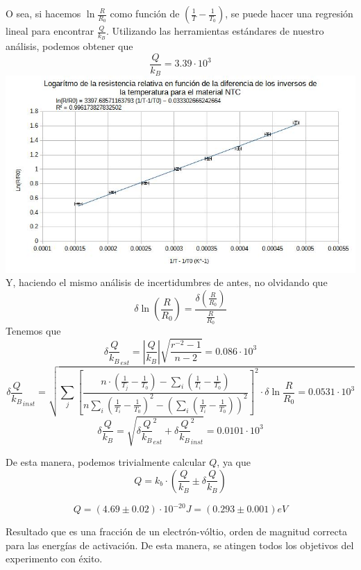 \documentclass[a4paper,12pt]{article}
\begin{document}
O sea, si hacemos $\ln{\frac{R}{R_0}}$ como función de $\left( \frac{1}{T}-\frac{1}{T_0} \right)$, se puede hacer una regresión lineal para encontrar $\frac{Q}{k_B}$. Utilizando las herramientas estándares de nuestro análisis, podemos obtener que
$$\frac{Q}{k_B} = 3.39\cdot 10^3$$
\includegraphics[width=\textwidth]{Exp1_ExpRegr.jpg}
Y, haciendo el mismo análisis de incertidumbres de antes, no olvidando que 
$$\delta\ln(\frac{R}{R_0}) = \frac{\delta \left( \frac{R}{R_0} \right)}{\frac{R}{R_0}}$$
Tenemos que 
$$\delta\frac{Q}{k_B}_{est} = |\frac{Q}{k_B}|\sqrt{\frac{r^{-2}-1}{n-2}} = 0.086\cdot 10^{3}$$
$$\delta\frac{Q}{k_B}_{inst} = \sqrt{\sum_j\left[ \frac{n\cdot\left( \frac{1}{T_j}-\frac{1}{T_0} \right)-\sum_i \left( \frac{1}{T_i}-\frac{1}{T_0} \right)}{n\sum_i \left( \frac{1}{T_i}-\frac{1}{T_0} \right)^2-\left(  \sum_i \left( \frac{1}{T_i}-\frac{1}{T_0} \right)\right)^2} \right]^2\cdot\delta\ln{\frac{R}{R_0}} = 0.0531 \cdot 10^{3}}$$
$$\delta\frac{Q}{k_B}= \sqrt{\delta\frac{Q}{k_B}_{est}^2+\delta\frac{Q}{k_B}_{inst}^2} = 0.0101 \cdot 10^{3} $$

De esta manera, podemos trivialmente calcular $Q$, ya que 
$$Q = k_b \cdot \left( \frac{Q}{k_B} \pm \delta\frac{Q}{k_B} \right)$$
\begin{tcolorbox}
    \begin{equation}
        Q = (4.69 \pm 0.02) \cdot 10^{-20} J = (0.293 \pm 0.001) eV
    \end{equation}
\end{tcolorbox}

Resultado que es una fracción de un electrón-vóltio, orden de magnitud correcta para las energías de activación. De esta manera, se atingen todos los objetivos del experimento con éxito.

\printbibliography
\end{document}
